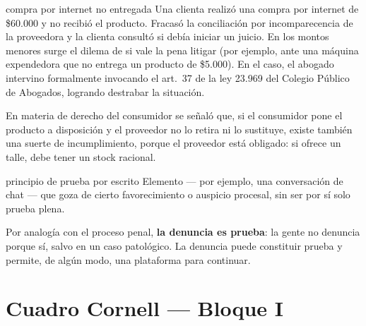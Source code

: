 \documentclass[12pt,oneside]{book}
\begin{document}
\begin{example}{compra por internet no entregada}
Una clienta realizó una compra por internet de \$60.000 y no recibió el producto. Fracasó la conciliación por incomparecencia de la proveedora y la clienta consultó si debía iniciar un juicio. En los montos menores surge el dilema de si vale la pena litigar (por ejemplo, ante una máquina expendedora que no entrega un producto de \$5.000). En el caso, el abogado intervino formalmente invocando el art.\ 37 de la ley 23.969 del Colegio Público de Abogados, logrando destrabar la situación.
\end{example}

En materia de derecho del consumidor se señaló que, si el consumidor pone el producto a disposición y el proveedor no lo retira ni lo sustituye, existe también una suerte de incumplimiento, porque el proveedor está obligado: si ofrece un talle, debe tener un stock racional.

\begin{definition}{principio de prueba por escrito}
Elemento --- por ejemplo, una conversación de chat --- que goza de cierto favorecimiento o auspicio procesal, sin ser por sí solo prueba plena.
\end{definition}

Por analogía con el proceso penal, \textbf{la denuncia es prueba}: la gente no denuncia porque sí, salvo en un caso patológico. La denuncia puede constituir prueba y permite, de algún modo, una plataforma para continuar.

\section{Cuadro Cornell --- Bloque I}
\end{document}
